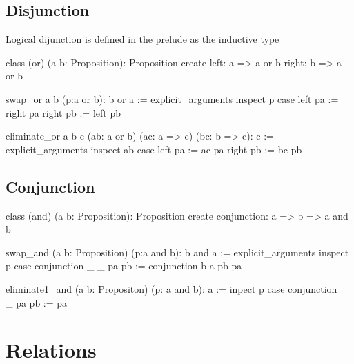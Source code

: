 \subsection{Disjunction}

Logical dijunction is defined in the prelude as the inductive type
%
\begin{alba}
  class
    (or) (a b: Proposition): Proposition
  create
    left:  a => a or b
    right: b => a or b
\end{alba}


\begin{alba}
  swap_or a b (p:a or b): b or a :=
    explicit_arguments
      inspect
        p
      case
        left  pa := right pa
        right pb := left  pb
\end{alba}

\begin{alba}
  eliminate_or a b c (ab: a or b) (ac: a => c) (bc: b => c): c :=
    explicit_arguments
      inspect
        ab
      case
        left  pa :=
          ac pa
        right pb :=
          bc pb
\end{alba}


\subsection{Conjunction}

\begin{alba}
  class
    (and) (a b: Proposition): Proposition
  create
    conjunction: a => b => a and b
\end{alba}


\begin{alba}
  swap_and (a b: Proposition) (p:a and b): b and a :=
    explicit_arguments
      inspect
        p
      case
        conjunction _ _ pa pb := conjunction b a pb pa
\end{alba}


\begin{alba}
  eliminate1_and (a b: Propositon) (p: a and b): a :=
    inpect p case
      conjunction _ _ pa pb := pa
\end{alba}







\newpage
\section{Relations}
\label{sec:certprog-relations}


